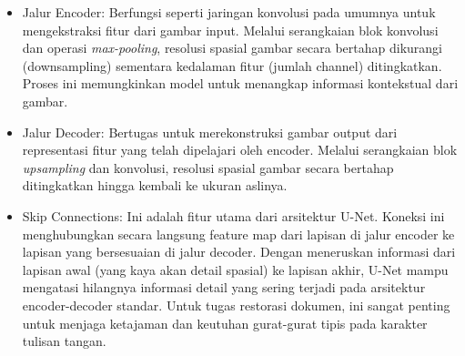 \documentclass[12pt,a4paper]{article}
\begin{document}
\begin{itemize}
    \item Jalur Encoder: Berfungsi seperti jaringan konvolusi pada umumnya untuk mengekstraksi fitur dari gambar input. Melalui serangkaian blok konvolusi dan operasi \textit{max-pooling}, resolusi spasial gambar secara bertahap dikurangi (downsampling) sementara kedalaman fitur (jumlah channel) ditingkatkan. Proses ini memungkinkan model untuk menangkap informasi kontekstual dari gambar.

    \item Jalur Decoder: Bertugas untuk merekonstruksi gambar output dari representasi fitur yang telah dipelajari oleh encoder. Melalui serangkaian blok \textit{upsampling} dan konvolusi, resolusi spasial gambar secara bertahap ditingkatkan hingga kembali ke ukuran aslinya.

    \item Skip Connections: Ini adalah fitur utama dari arsitektur U-Net. Koneksi ini menghubungkan secara langsung feature map dari lapisan di jalur encoder ke lapisan yang bersesuaian di jalur decoder. Dengan meneruskan informasi dari lapisan awal (yang kaya akan detail spasial) ke lapisan akhir, U-Net mampu mengatasi hilangnya informasi detail yang sering terjadi pada arsitektur encoder-decoder standar. Untuk tugas restorasi dokumen, ini sangat penting untuk menjaga ketajaman dan keutuhan gurat-gurat tipis pada karakter tulisan tangan.
\end{itemize}
\end{document}
